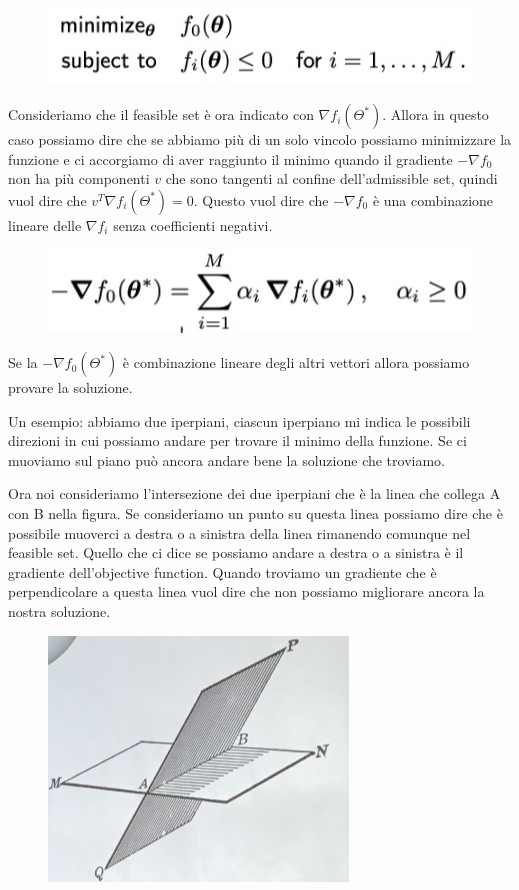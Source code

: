 \documentclass[14pt]{extreport}
\begin{document}
\begin{figure}[H]
	\centering
	\includegraphics[width=0.5\linewidth]{295.jpeg}
\end{figure}

Consideriamo che il feasible set è ora indicato con $\nabla f_i(\Theta^*)$. Allora in questo caso possiamo dire che se abbiamo più di un solo vincolo
possiamo minimizzare la funzione e ci accorgiamo di aver raggiunto il minimo quando il gradiente $-\nabla f_0$ non ha più componenti $v$ che sono
tangenti al confine dell'admissible set, quindi vuol dire che $v^T\nabla f_i(\Theta^*) = 0$. Questo vuol dire che $-\nabla f_0$ è una combinazione
lineare delle $\nabla f_i$ senza coefficienti negativi.

\begin{figure}[H]
	\centering
	\includegraphics[width=0.6\linewidth]{296.jpeg}
\end{figure}

Se la $-\nabla f_0(\Theta^*)$ è combinazione lineare degli altri vettori allora possiamo provare la soluzione.

Un esempio: abbiamo due iperpiani, ciascun iperpiano mi indica le possibili direzioni in cui possiamo andare per trovare il minimo della funzione. Se
ci muoviamo sul piano può ancora andare bene la soluzione che troviamo.

Ora noi consideriamo l'intersezione dei due iperpiani che è la linea che collega A con B nella figura. Se consideriamo un punto su questa linea
possiamo dire che è possibile muoverci a destra o a sinistra della linea rimanendo comunque nel feasible set. Quello che ci dice se possiamo andare a
destra o a sinistra è il gradiente dell'objective function. Quando troviamo un gradiente che è perpendicolare a questa linea vuol dire che non
possiamo migliorare ancora la nostra soluzione.
\begin{figure}[H]
	\centering
	\includegraphics[width=0.6\linewidth]{298.jpeg}
\end{figure}
\end{document}

